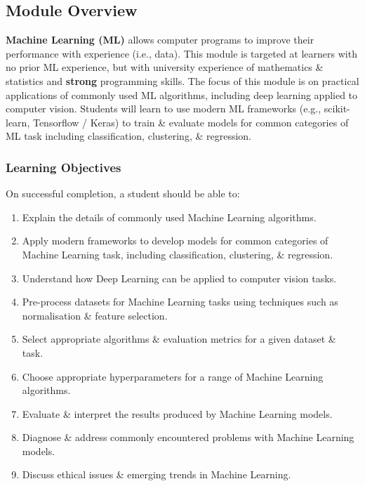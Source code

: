 \documentclass[a4paper,11pt]{article}
\begin{document}
\subsection{Module Overview}
\textbf{Machine Learning (ML)} allows computer programs to improve their performance with experience (i.e., data).
This module is targeted at learners with no prior ML experience, but with university experience of mathematics \& 
statistics and \textbf{strong} programming skills.
The focus of this module is on practical applications of commonly used ML algorithms, including deep learning 
applied to computer vision.
Students will learn to use modern ML frameworks (e.g., scikit-learn, Tensorflow / Keras) to train \& evaluate 
models for common categories of ML task including classification, clustering, \& regression.

\subsubsection{Learning Objectives}
On successful completion, a student should be able to:
\begin{enumerate}
    \item   Explain the details of commonly used Machine Learning algorithms.
    \item   Apply modern frameworks to develop models for common categories of Machine Learning task, including
            classification, clustering, \& regression.
    \item   Understand how Deep Learning can be applied to computer vision tasks.
    \item   Pre-process datasets for Machine Learning tasks using techniques such as normalisation \& feature 
            selection.
    \item   Select appropriate algorithms \& evaluation metrics for a given dataset \& task.
    \item   Choose appropriate hyperparameters for a range of Machine Learning algorithms.
    \item   Evaluate \& interpret the results produced by Machine Learning models.
    \item   Diagnose \& address commonly encountered problems with Machine Learning models.
    \item   Discuss ethical issues \& emerging trends in Machine Learning.
\end{enumerate}
\end{document}
